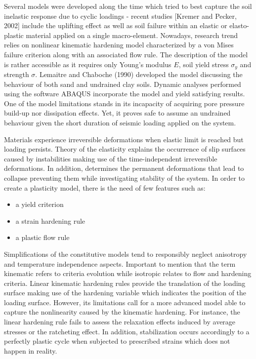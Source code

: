 \documentclass[10pt,a4paper]{report}
\begin{document}
Several models were developed along the time which tried to best capture the soil inelastic response due to cyclic loadings - recent studies [Kremer and Pecker, 2002] include the uplifting effect as well as soil failure within an elastic or elasto-plastic material applied on a single macro-element. Nowadays, research trend relies on nonlinear kinematic hardening model characterized by a von Mises failure criterion along with an associated flow rule. The description of the model is rather accessible as it requires only Young's modulus $E$, soil yield stress $\sigma_y$ and strength $\sigma$. Lemaitre and Chaboche (1990) developed the model discussing the behaviour of both sand and undrained clay soils. Dynamic analyses performed using the software ABAQUS incorporate the model and yield satisfying results. One of the model limitations stands in its incapacity of acquiring pore pressure build-up nor dissipation effects. Yet, it proves safe to assume an undrained behaviour given the short duration of seismic loading applied on the system.   

Materials experience irreversible deformations when elastic limit is reached but loading persists. Theory of the elasticity explains the occurrence of slip surfaces caused by instabilities making use of the time-independent irreversible deformations. In addition, determines the permanent deformations that lead to collapse preventing them while investigating stability of the system. 
In order to create a plasticity model, there is the need of few features such as:
\begin{itemize}
	\centering
	\item a yield criterion\
	\item a strain hardening rule\
	\item a plastic flow rule\
\end{itemize}

Simplifications of the constitutive models tend to responsibly neglect anisotropy and temperature independence aspects. Important to mention that the term kinematic refers to criteria evolution while isotropic relates to flow and hardening criteria. Linear kinematic hardening rules provide the translation of the loading surface making use of the hardening variable which indicates the position of the loading surface. However, its limitations call for a more advanced model able to capture the nonlinearity caused by the kinematic hardening. For instance, the linear hardening rule fails to assess the relaxation effects induced by average stresses or the ratcheting effect. In addition, stabilization occurs accordingly to a perfectly plastic cycle when subjected to prescribed strains which does not happen in reality.
\end{document}
